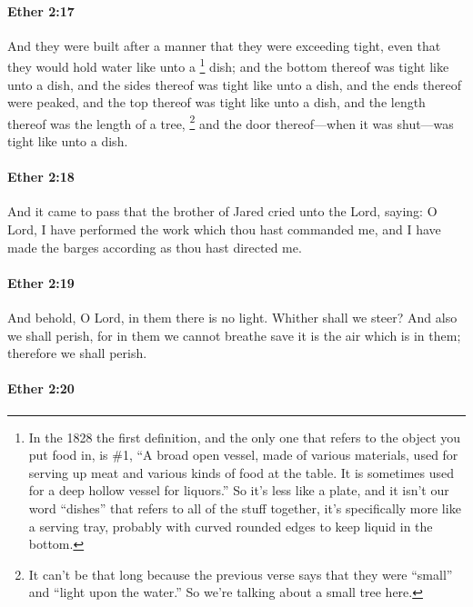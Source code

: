 		\paragraph{Ether 2:17} %
			\label{ETHER-2-17}

			And they were built after a manner that they were exceeding tight,
			even that they would hold water like unto a
				\footnote{%
					In the 1828 the first definition, and the only one that refers to the object you put food in, is 
					\#1, ``A broad open vessel, made of various materials, used for serving up meat and various kinds of food at the table. It is sometimes used for a deep hollow vessel for liquors.'' So it's less like a plate, and it isn't our word ``dishes'' that refers to all of the stuff together, it's specifically more like a serving tray, probably with curved rounded edges to keep liquid in the bottom.
					}%
			dish;
			and the bottom thereof was tight like unto a dish,
			and the sides thereof was tight like unto a dish,
			and the ends thereof were peaked,
			and the top thereof was tight like unto a dish,
			and the length thereof was the length of a tree,%
				\footnote{%
					It can't be that long because the previous verse says that they were ``small'' and ``light upon the water.'' So we're talking about a small tree here.
					}
			and the door thereof---when it was shut---was tight like unto a dish.

		\paragraph{Ether 2:18} %
			\label{ETHER-2-18}

			And it came to pass that the brother of Jared cried unto the Lord, saying:
			O Lord, I have performed the work which thou hast commanded me,
			and I have made the barges according as thou hast directed me.

		\paragraph{Ether 2:19} %
			\label{ETHER-2-19}

			And behold, O Lord, in them there is no light.
			Whither shall we steer?
			And also we shall perish,
			for in them we cannot breathe
			save it is the air which is in them;
			therefore we shall perish.

		\paragraph{Ether 2:20} %
			\label{ETHER-2-20}


